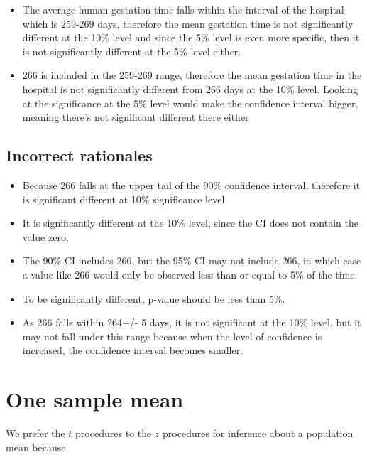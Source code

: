 \documentclass[letterpaper,9pt,twoside,printwatermark=false]{pinp}
\providecommand{\tightlist}{%
  \setlength{\itemsep}{0pt}\setlength{\parskip}{0pt}}
\begin{document}
\begin{itemize}
\tightlist
\item
  The average human gestation time falls within the interval of the
  hospital which is 259-269 days, therefore the mean gestation time is
  not significantly different at the 10\% level and since the 5\% level
  is even more specific, then it is not significantly different at the
  5\% level either.
\item
  266 is included in the 259-269 range, therefore the mean gestation
  time in the hospital is not significantly different from 266 days at
  the 10\% level. Looking at the significance at the 5\% level would
  make the confidence interval bigger, meaning there's not significant
  different there either
\end{itemize}

\hypertarget{incorrect-rationales-3}{%
\subsection{Incorrect rationales}\label{incorrect-rationales-3}}

\begin{itemize}
\tightlist
\item
  Because 266 falls at the upper tail of the 90\% confidence interval,
  therefore it is significant different at 10\% significance level
\item
  It is significantly different at the 10\% level, since the CI does not
  contain the value zero.
\item
  The 90\% CI includes 266, but the 95\% CI may not include 266, in
  which case a value like 266 would only be observed less than or equal
  to 5\% of the time.
\item
  To be significantly different, p-value should be less than 5\%.
\item
  As 266 falls within 264+/- 5 days, it is not significant at the 10\%
  level, but it may not fall under this range because when the level of
  confidence is increased, the confidence interval becomes smaller.
\end{itemize}

\hypertarget{one-sample-mean}{%
\section{One sample mean}\label{one-sample-mean}}

We prefer the \(t\) procedures to the \(z\) procedures for inference
about a population mean because
\end{document}
